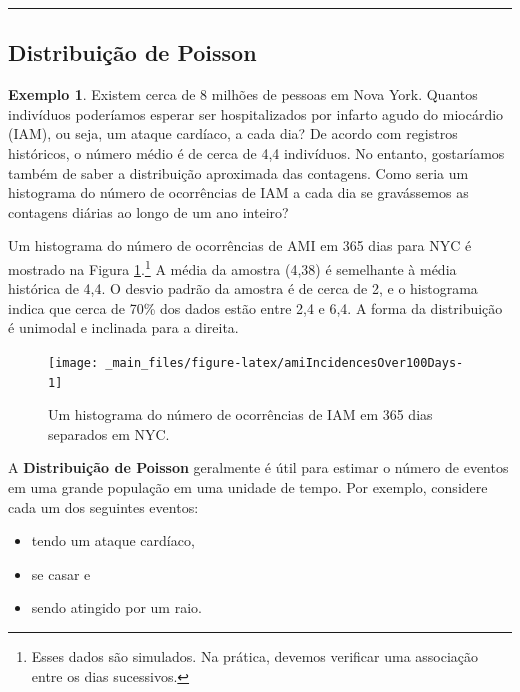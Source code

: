 \documentclass[
]{book}
\theoremstyle{definition}
\theoremstyle{definition}
\newtheorem{example}{Exemplo}[chapter]
\theoremstyle{definition}
\theoremstyle{definition}
\theoremstyle{remark}
\begin{document}
\begin{center}\rule{0.5\linewidth}{0.5pt}\end{center}

\hypertarget{poissonDistribution}{%
\subsection{Distribuição de Poisson}\label{poissonDistribution}}

\begin{example}
\protect\hypertarget{exm:unnamed-chunk-148}{}{\label{exm:unnamed-chunk-148} }Existem cerca de 8 milhões de pessoas em Nova York. Quantos indivíduos poderíamos esperar ser hospitalizados por infarto agudo do miocárdio (IAM), ou seja, um ataque cardíaco, a cada dia? De acordo com registros históricos, o número médio é de cerca de 4,4 indivíduos. No entanto, gostaríamos também de saber a distribuição aproximada das contagens. Como seria um histograma do número de ocorrências de IAM a cada dia se gravássemos as contagens diárias ao longo de um ano inteiro?
\end{example}

Um histograma do número de ocorrências de AMI em 365 dias para NYC é mostrado na Figura \ref{fig:amiIncidencesOver100Days}.\footnote{Esses dados são simulados. Na prática, devemos verificar uma associação entre os dias sucessivos.} A média da amostra (4,38) é semelhante à média histórica de 4,4. O desvio padrão da amostra é de cerca de 2, e o histograma indica que cerca de 70\% dos dados estão entre 2,4 e 6,4. A forma da distribuição é unimodal e inclinada para a direita.

\begin{figure}

{\centering \texttt{[image: \_main\_files/figure-latex/amiIncidencesOver100Days-1]} 

}

\caption{Um histograma do número de ocorrências de IAM em 365 dias separados em NYC.}\label{fig:amiIncidencesOver100Days}
\end{figure}

A \textbf{Distribuição de Poisson} geralmente é útil para estimar o número de eventos em uma grande população em uma unidade de tempo. Por exemplo, considere cada um dos seguintes eventos:

\begin{itemize}
\item
  tendo um ataque cardíaco,
\item
  se casar e
\item
  sendo atingido por um raio.
\end{itemize}
\end{document}
